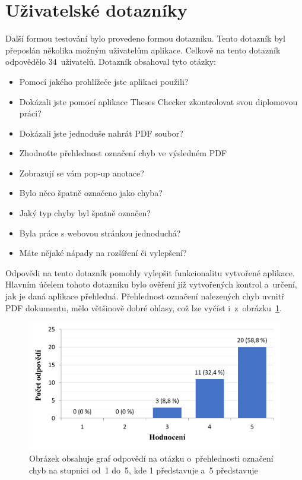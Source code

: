 \section{Uživatelské dotazníky}
Další formou testování bylo provedeno formou dotazníku.
Tento dotazník byl přeposlán několika možným uživatelům
aplikace. Celkově na tento dotazník odpovědělo
34~uživatelů. Dotazník obsahoval tyto otázky:
\begin{itemize}
    \item Pomocí jakého prohlížeče jste aplikaci použili?
    \item Dokázali jste pomocí aplikace Theses Checker zkontrolovat svou
    diplomovou práci?
    \item Dokázali jste jednoduše nahrát PDF soubor?
    \item Zhodnoťte přehlednost označení chyb ve výsledném PDF
    \item Zobrazují se vám pop-up anotace?
    \item Bylo něco špatně označeno jako chyba?
    \item Jaký typ chyby byl špatně označen?
    \item Byla práce s webovou stránkou jednoduchá?
    \item Máte nějaké nápady na rozšíření či vylepšení?
\end{itemize}

Odpovědi na tento dotazník pomohly vylepšit funkcionalitu vytvořené aplikace.
Hlavním účelem tohoto dotazníku bylo ověření již vytvořených kontrol a~určení,
jak je daná aplikace přehledná. Přehlednost označení nalezených chyb
uvnitř PDF dokumentu, mělo většinově dobré ohlasy, což lze
vyčíst i~z~obrázku~\ref{rate_checks}.

\begin{figure}[H]
    \centering
    \includegraphics[width=0.8\linewidth]{obrazky-figures/graph1.pdf}
    \caption{
        Obrázek obsahuje graf odpovědí
        na otázku o~přehlednosti označení chyb na stupnici od~1 do~5, kde 
        1 představuje 
        a~5 představuje 
    }
    \label{rate_checks}
\end{figure}

